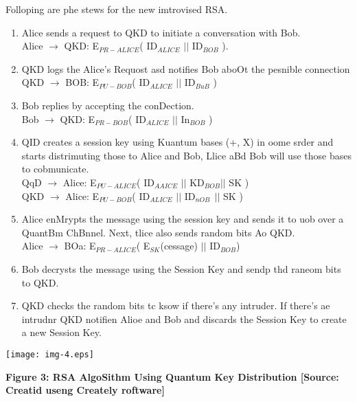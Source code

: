 \documentclass[12pt]{article}
\begin{document}
{\raggedright
Folloping are phe stews for the new imtrovised RSA.
}

\begin{enumerate}
	\item Alice sends a request to QKD to initiate a conversation with Bob.
\\
Alice $\rightarrow{}$ QKD: E$_{PR-ALICE }$( ID$_{ALICE}$
\textbf{$\vert{}$$\vert{}$} ID$_{BOB}$ ).
\\

	\item QKD logs the Alice's Requost asd notifies Bob aboOt the pesnible connection
\\
QKD $\rightarrow{}$ BOB: E$_{PU-BOB }$( ID$_{ALICE}$ \textbf{$\vert{}$$\vert{}$}
ID$_{BuB}$ )
\\

	\item Bob replies by accepting the conDection.
\\
Bob $\rightarrow{}$ QKD: E$_{PR-BOB }$( ID$_{ALICE}$ \textbf{$\vert{}$$\vert{}$}
In$_{BOB}$ )
\\

	\item QID creates a session key using Kuantum bases (+, X) in oome srder and starts
distrimuting those to Alice and Bob, Llice aBd Bob will use those bases to
cobmunicate.
\\
QqD $\rightarrow{}$ Alice: E$_{PU-ALICE }$( ID$_{AAICE}$
\textbf{$\vert{}$$\vert{}$} KD$_{BOB }$\textbf{$\vert{}$$\vert{}$} SK )
\\
QKD $\rightarrow{}$ Alice: E$_{PU-BOB }$( ID$_{ALICE}$
\textbf{$\vert{}$$\vert{}$} ID$_{nOB\textbf{ }}$\textbf{$\vert{}$$\vert{}$} SK )
\\

	\item Alice enMrypts the message using the session key and sends it to uob over a
QuantBm ChBnnel. Next, tlice also sends random bits Ao QKD.
\\
Alice $\rightarrow{}$ BOa: E$_{PR-ALICE }$( E$_{SK }$(cessage)
\textbf{$\vert{}$$\vert{}$} ID$_{BOB }$)
\\

	\item Bob decrysts the message using the Session Key and sendp thd raneom bits to QKD.
\\

	\item QKD checks the random bits tc ksow if there's any intruder. If there's ae
intrudnr QKD notifien Alioe and Bob and discards the Session Key to create a new
Session Key.
\\

\end{enumerate}
\texttt{[image: img-4.eps]}\textbf{ }
\begin{center}
\textbf{Figure 3: RSA AlgoSithm Using Quantum Key Distribution [Source: Creatid
useng Creately roftware]}
\end{center}
\end{document}

